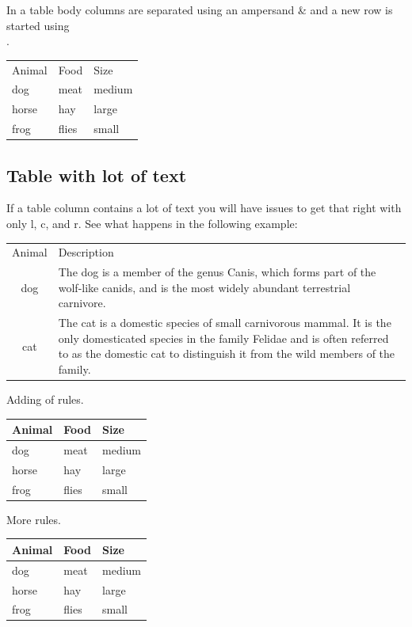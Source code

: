 \documentclass[12]{article}
\begin{document}
    In a table body columns are separated using an ampersand \& and a new row is started using \\.

    \begin{tabular}{lll}
    Animal & Food  & Size   \\
    dog    & meat  & medium \\
    horse  & hay   & large  \\
    frog   & flies & small  \\
    \end{tabular}

    \subsection{Table with lot of text}%
    \label{sub:Table with lot of text}
   
    If a table column contains a lot of text you will have issues to get that right with only l, c, and r. See what happens in the following example:

    \begin{tabular}{cp{9cm}}
      Animal & Description \\
      dog    & The dog is a member of the genus Canis, which forms part of the
               wolf-like canids, and is the most widely abundant terrestrial
               carnivore. \\
      cat    & The cat is a domestic species of small carnivorous mammal. It is the
               only domesticated species in the family Felidae and is often referred
               to as the domestic cat to distinguish it from the wild members of the
               family. \\
    \end{tabular}

    Adding of rules.

    \begin{tabular}{lll}
      \toprule
      Animal & Food  & Size   \\
      \midrule
      dog    & meat  & medium \\
      horse  & hay   & large  \\
      frog   & flies & small  \\
      \bottomrule
    \end{tabular}

    
    More rules.

    \begin{tabular}{lll}
      \toprule
      Animal & Food  & Size   \\
      \midrule
      dog    & meat  & medium \\
      \cmidrule{1-2}
      horse  & hay   & large  \\
      \cmidrule{1-1}
      \cmidrule{3-3}
      frog   & flies & small  \\
      \bottomrule
    \end{tabular}
\end{document}

